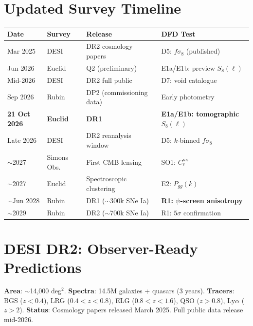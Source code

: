 \documentclass[11pt,a4paper]{article}
\begin{document}
\section{Updated Survey Timeline}
\label{sec:timeline}

\begin{center}
\begin{tabular}{llll}
\toprule
\textbf{Date} & \textbf{Survey} & \textbf{Release} & \textbf{DFD Test} \\
\midrule
Mar 2025 & DESI & DR2 cosmology papers & D5: $f\sigma_8$ (published) \\
Jun 2026 & Euclid & Q2 (preliminary) & E1a/E1b: preview $S_8(\ell)$ \\
Mid-2026 & DESI & DR2 full public & D7: void catalogue \\
Sep 2026 & Rubin & DP2 (commissioning data) & Early photometry \\
\textbf{21 Oct 2026} & \textbf{Euclid} & \textbf{DR1} &
  \textbf{E1a/E1b: tomographic $S_8(\ell)$} \\
Late 2026 & DESI & DR2 reanalysis window & D5: $k$-binned $f\sigma_8$ \\
$\sim$2027 & Simons Obs. & First CMB lensing & SO1: $C_\ell^{\kappa\kappa}$ \\
$\sim$2027 & Euclid & Spectroscopic clustering & E2: $P_{gg}(k)$ \\
$\sim$Jun 2028 & Rubin & DR1 ($\sim$300k SNe Ia) &
  \textbf{R1: $\psi$-screen anisotropy} \\
$\sim$2029 & Rubin & DR2 ($\sim$700k SNe Ia) & R1: $5\sigma$ confirmation \\
\bottomrule
\end{tabular}
\end{center}


\section{DESI DR2: Observer-Ready Predictions}
\label{sec:desi}

\begin{surveybox}
\textbf{Area}: $\sim$14,000 deg$^2$. \textbf{Spectra}: 14.5M galaxies +
quasars (3 years). \textbf{Tracers}: BGS ($z < 0.4$), LRG ($0.4 < z < 0.8$),
ELG ($0.8 < z < 1.6$), QSO ($z > 0.8$), Ly$\alpha$ ($z > 2$).
\textbf{Status}: Cosmology papers released March 2025. Full public data
release mid-2026.
\end{surveybox}
\end{document}
